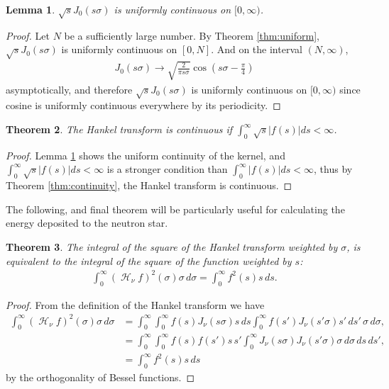 \documentclass[12pt]{article}
\DeclareMathOperator{\Hsign}{\mathscr{H}}
\newcommand\Hank[2][]{{\left( \Hsign_{#1} #2 \right) }}
\newtheorem{theorem}{Theorem}[section]
\newtheorem{lemma}[theorem]{Lemma}
\begin{document}
\begin{lemma}
$\sqrt{s}J_0(s \sigma)$ is uniformly continuous on $[0,\infty)$.
\label{lem:Jcont}
\end{lemma}
\begin{proof}
Let $N$ be a sufficiently large number. By Theorem \ref{thm:uniform}, $\sqrt{s}J_0(s \sigma)$ is uniformly continuous on $[0,N]$. And on the interval $(N,\infty)$,
\begin{align*}
J_0(s \sigma) \rightarrow \sqrt{\frac{2}{\pi s \sigma}} \cos \left( s \sigma - \frac{\pi}{4} \right)
\end{align*}
asymptotically, and therefore $\sqrt{s}J_0(s \sigma)$ is uniformly continuous on $[0,\infty)$ since cosine is uniformly continuous everywhere by its periodicity.
\end{proof}

\begin{theorem}
The Hankel transform is continuous if $\int_0^\infty \sqrt{s}|f(s)| ds < \infty$.
\end{theorem}
\begin{proof}
Lemma \ref{lem:Jcont} shows the uniform continuity of the kernel, and $\int_0^\infty \sqrt{s}|f(s)| ds < \infty$ is a stronger condition than $\int_0^\infty |f(s)| ds < \infty$, thus by Theorem \ref{thm:continuity}, the Hankel transform is continuous.
\end{proof}

The following, and final theorem will be particularly useful for calculating the energy deposited to the neutron star.
\begin{theorem}
\label{thm:square}
The integral of the square of the Hankel transform weighted by $\sigma$, is equivalent to the integral of the square of the function weighted by $s$:
\begin{align*}
\int_0^\infty \Hank[\nu]{f}^2(\sigma) \sigma \, d\sigma = \int_0^\infty f^2(s)s \, ds.
\end{align*}
\end{theorem}

\begin{proof}
From the definition of the Hankel transform we have
\begin{align*}
\int_0^\infty \Hank[\nu]{f}^2(\sigma) \sigma \, d\sigma &= \int_0^\infty \int_0^\infty f(s) J_\nu(s \sigma) s \, ds \int_0^\infty f(s') J_\nu(s' \sigma) s' \, ds' \, \sigma \, d\sigma, \\
&= \int_0^\infty \int_0^\infty f(s) f(s') s \, s' \int_0^\infty J_\nu(s \sigma) J_\nu(s' \sigma) \sigma \, d\sigma \, ds \, ds', \\
&= \int_0^\infty f^2(s) s \, ds
\end{align*}
by the orthogonality of Bessel functions.
\end{proof}
\end{document}
